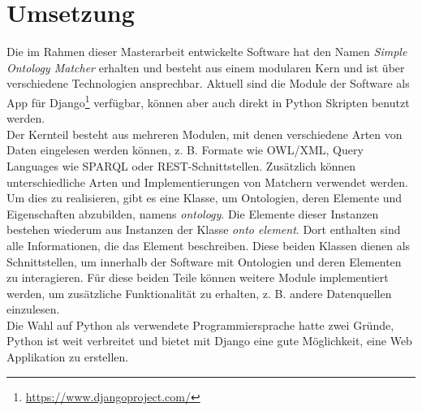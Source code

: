 %
\chapter{Umsetzung}
\label{chap:implementation}
		
		Die im Rahmen dieser Masterarbeit entwickelte Software hat den Namen
		\textit{Simple Ontology Matcher} erhalten und besteht aus einem modularen Kern
		und ist über verschiedene Technologien ansprechbar. Aktuell sind die Module
		der Software als App für Django\footnote{\url{https://www.djangoproject.com/}} verfügbar, können
		aber auch direkt in Python Skripten benutzt werden.\\
		Der Kernteil besteht aus mehreren Modulen, mit denen verschiedene Arten von
		Daten eingelesen werden können, z. B.
		Formate wie OWL/XML, Query Languages wie SPARQL oder REST-Schnittstellen.
		Zusätzlich können unterschiedliche Arten und Implementierungen von Matchern
		verwendet werden. Um dies zu realisieren, gibt es eine Klasse, um Ontologien,
		deren Elemente und Eigenschaften abzubilden, namens \textit{ontology}.
		Die Elemente dieser Instanzen bestehen wiederum aus Instanzen der Klasse
		\textit{onto element}. Dort enthalten sind alle Informationen, die das Element
		beschreiben. Diese beiden Klassen dienen als Schnittstellen, um innerhalb der
		Software mit Ontologien und deren Elementen zu interagieren. Für diese beiden
		Teile können weitere Module implementiert werden, um zusätzliche
		Funktionalität zu erhalten, z. B. andere Datenquellen einzulesen.\\
		Die Wahl auf Python als verwendete Programmiersprache hatte zwei Gründe,
		Python ist weit verbreitet und bietet mit Django eine gute Möglichkeit, eine
		Web Applikation zu erstellen.
		
